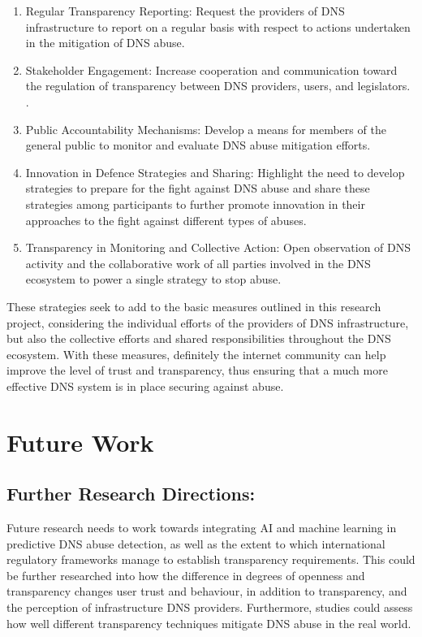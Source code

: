 \begin{enumerate}

    \item Regular Transparency Reporting: Request the providers of DNS infrastructure to report on a regular basis with respect to actions undertaken in the mitigation of DNS abuse.

    \item Stakeholder Engagement: Increase cooperation and communication toward the regulation of transparency between DNS providers, users, and legislators.
.
    \item Public Accountability Mechanisms: Develop a means for members of the general public to monitor and evaluate DNS abuse mitigation efforts.
    
    \item Innovation in Defence Strategies and Sharing: Highlight the need to develop strategies to prepare for the fight against DNS abuse and share these strategies among participants to further promote innovation in their approaches to the fight against different types of abuses.
    
    \item Transparency in Monitoring and Collective Action: Open observation of DNS activity and the collaborative work of all parties involved in the DNS ecosystem to power a single strategy to stop abuse.
    
\end{enumerate}

These strategies seek to add to the basic measures outlined in this research project, considering the individual efforts of the providers of DNS infrastructure, but also the collective efforts and shared responsibilities throughout the DNS ecosystem. With these measures, definitely the internet community can help improve the level of trust and transparency, thus ensuring that a much more effective DNS system is in place securing against abuse.

\section{Future Work}

\subsection{Further Research Directions:} Future research needs to work towards integrating AI and machine learning in predictive DNS abuse detection, as well as the extent to which international regulatory frameworks manage to establish transparency requirements. This could be further researched into how the difference in degrees of openness and transparency changes user trust and behaviour, in addition to transparency, and the perception of infrastructure DNS providers. Furthermore, studies could assess how well different transparency techniques mitigate DNS abuse in the real world.

